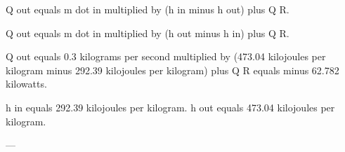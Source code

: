 Q out equals m dot in multiplied by (h in minus h out) plus Q R.  

Q out equals m dot in multiplied by (h out minus h in) plus Q R.  

Q out equals 0.3 kilograms per second multiplied by (473.04 kilojoules per kilogram minus 292.39 kilojoules per kilogram) plus Q R equals minus 62.782 kilowatts.  

h in equals 292.39 kilojoules per kilogram.  
h out equals 473.04 kilojoules per kilogram.  

---